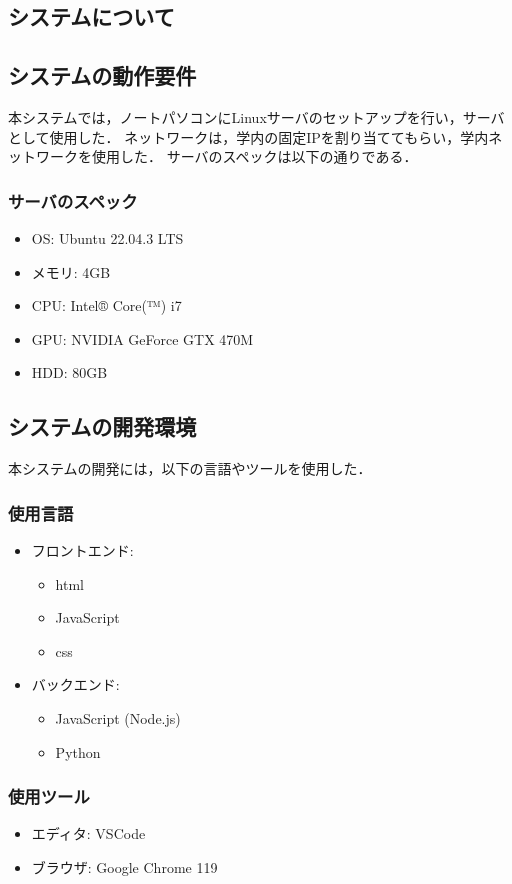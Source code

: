 \begin{multicols*}{2}
\section{システムについて} 

\subsection{システムの動作要件} 本システムでは，ノートパソコンにLinuxサーバのセットアップを行い，サーバとして使用した． ネットワークは，学内の固定IPを割り当ててもらい，学内ネットワークを使用した． 
サーバのスペックは以下の通りである．
\subsubsection{サーバのスペック} 
\begin{itemize} 
	\item OS: Ubuntu 22.04.3 LTS 
	\item メモリ: 4GB 
	\item CPU: Intel® Core(™) i7 
	\item GPU: NVIDIA GeForce GTX 470M \item HDD: 80GB 
\end{itemize}
\subsection{システムの開発環境} 本システムの開発には，以下の言語やツールを使用した．
\subsubsection{使用言語} 
\begin{itemize} 
	\item フロントエンド: 
	\begin{itemize} 
		\item html 
		\item JavaScript 
		\item css 
	\end{itemize} 
	\item バックエンド: 
	\begin{itemize} 
		\item JavaScript (Node.js) 
		\item Python 
	\end{itemize} 
\end{itemize}
\subsubsection{使用ツール} 
\begin{itemize} 
	\item エディタ: VSCode 
	\item ブラウザ: Google Chrome 119 
\end{itemize}


\end{multicols*}
